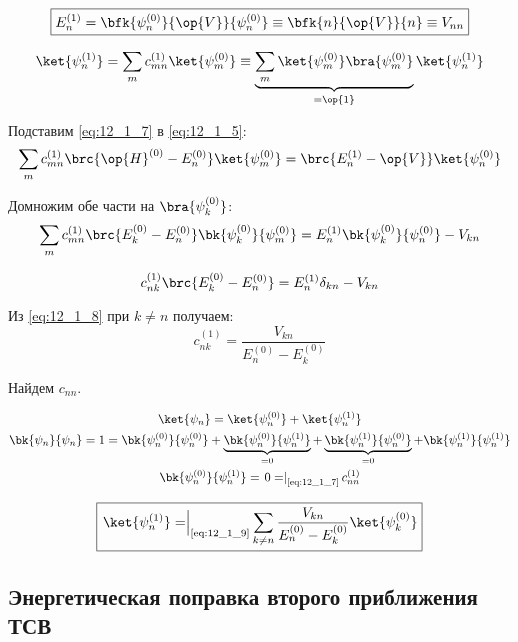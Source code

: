 \begin{equation}
\label{eq:12_1_7}
\boxed{E_n^{(1)} = \bfk{\psi_n^{(0)}}{\op{V}}{\psi_n^{(0)}} \equiv \bfk{n}{\op{V}}{n} \equiv V_{nn}}
\end{equation}

$$
\ket{\psi_n^{(1)}} = \sum_m c_{mn}^{(1)} \ket{\psi_m^{(0)}} \equiv \underbrace{\sum_m \ket{\psi_m^{(0)}} \bra{\psi_m^{(0)}}}_{=\op{1}} \ket{\psi_n^{(1)}}
$$

Подставим \eqref{eq:12_1_7} в \eqref{eq:12_1_5}:
$$
\sum_m c_{mn}^{(1)} \brc{\op{H}^{(0)} - E_n^{(0)}}\ket{\psi_m^{(0)}} = \brc{E_n^{(1)} - \op{V}}\ket{\psi_n^{(0)}}
$$

Домножим обе части на $\bra{\psi_k^{(0)}}$:
$$
\sum_m c_{mn}^{(1)}\brc{E_k^{(0)} - E_n^{(0)}} \bk{\psi_k^{(0)}}{\psi_m^{(0)}} = E_n^{(1)} \bk{\psi_k^{(0)}}{\psi_n^{(0)}} - V_{kn}
$$

\begin{equation}
\label{eq:12_1_8}
c_{nk}^{(1)} \brc{E_k^{(0)} - E_n^{(0)}} = E_n^{(1)} \delta_{kn} - V_{kn}
\end{equation}

Из \eqref{eq:12_1_8} при $k \neq n$ получаем:
\begin{equation}
\label{eq:12_1_9}
c_{nk}^{(1)} = \frac{V_{kn}}{E_n^{(0)} - E_k^{(0)}}
\end{equation}

Найдем $c_{nn}$.

\begin{gather*}
\ket{\psi_n} = \ket{\psi_n^{(0)}} + \ket{\psi_n^{(1)}}\\
\bk{\psi_n}{\psi_n} = 1 = \bk{\psi_n^{(0)}}{\psi_n^{(0)}} + \underbrace{\bk{\psi_n^{(0)}}{\psi_n^{(1)}}}_{=0} + \underbrace{\bk{\psi_n^{(1)}}{\psi_n^{(0)}}}_{=0} + \bk{\psi_n^{(1)}}{\psi_n^{(1)}}\\
\bk{\psi_n^{(0)}}{\psi_n^{(1)}} = \left. 0 = \right|_{\text{\eqref{eq:12_1_7}}} c_{nn}^{(1)} 
\end{gather*}

\begin{equation}
\label{eq:12_1_10}
\boxed{\left. \ket{\psi_n^{(1)}}= \right|_{\text{\eqref{eq:12_1_9}}} \sum_{k \neq n} \frac{V_{kn}}{E_n^{(0)} - E_k^{(0)}} \ket{\psi_k^{(0)}}}
\end{equation}

\subsection{Энергетическая поправка второго приближения ТСВ}

